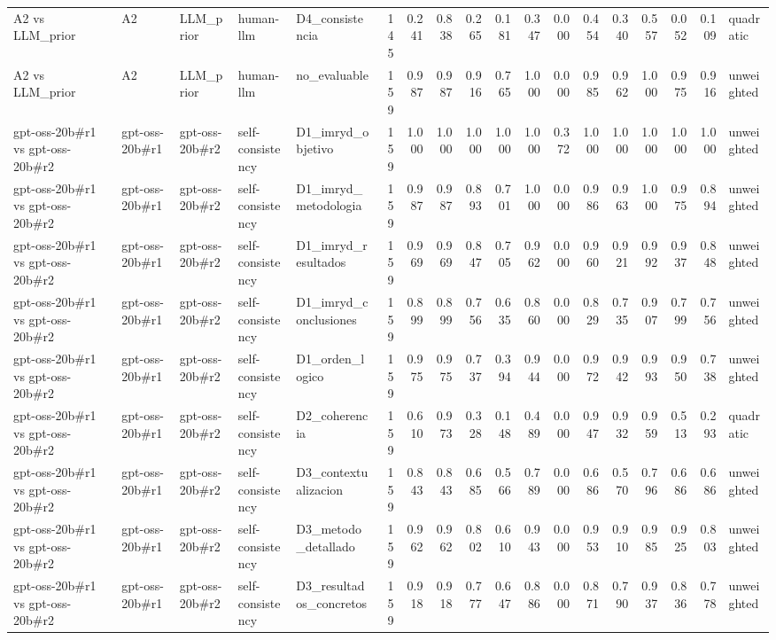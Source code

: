 \begin{table}
{\begin{tabular}{lllllrrrrrrrrrrrrl}
A2 vs LLM\_prior & A2 & LLM\_prior & human-llm & D4\_consistencia & 145 & 0.241 & 0.838 & 0.265 & 0.181 & 0.347 & 0.000 & 0.454 & 0.340 & 0.557 & 0.052 & 0.109 & quadratic \\
A2 vs LLM\_prior & A2 & LLM\_prior & human-llm & no\_evaluable & 159 & 0.987 & 0.987 & 0.916 & 0.765 & 1.000 & 0.000 & 0.985 & 0.962 & 1.000 & 0.975 & 0.916 & unweighted \\
gpt-oss-20b\#r1 vs gpt-oss-20b\#r2 & gpt-oss-20b\#r1 & gpt-oss-20b\#r2 & self-consistency & D1\_imryd\_objetivo & 159 & 1.000 & 1.000 & 1.000 & 1.000 & 1.000 & 0.372 & 1.000 & 1.000 & 1.000 & 1.000 & 1.000 & unweighted \\
gpt-oss-20b\#r1 vs gpt-oss-20b\#r2 & gpt-oss-20b\#r1 & gpt-oss-20b\#r2 & self-consistency & D1\_imryd\_metodologia & 159 & 0.987 & 0.987 & 0.893 & 0.701 & 1.000 & 0.000 & 0.986 & 0.963 & 1.000 & 0.975 & 0.894 & unweighted \\
gpt-oss-20b\#r1 vs gpt-oss-20b\#r2 & gpt-oss-20b\#r1 & gpt-oss-20b\#r2 & self-consistency & D1\_imryd\_resultados & 159 & 0.969 & 0.969 & 0.847 & 0.705 & 0.962 & 0.000 & 0.960 & 0.921 & 0.992 & 0.937 & 0.848 & unweighted \\
gpt-oss-20b\#r1 vs gpt-oss-20b\#r2 & gpt-oss-20b\#r1 & gpt-oss-20b\#r2 & self-consistency & D1\_imryd\_conclusiones & 159 & 0.899 & 0.899 & 0.756 & 0.635 & 0.860 & 0.000 & 0.829 & 0.735 & 0.907 & 0.799 & 0.756 & unweighted \\
gpt-oss-20b\#r1 vs gpt-oss-20b\#r2 & gpt-oss-20b\#r1 & gpt-oss-20b\#r2 & self-consistency & D1\_orden\_logico & 159 & 0.975 & 0.975 & 0.737 & 0.394 & 0.944 & 0.000 & 0.972 & 0.942 & 0.993 & 0.950 & 0.738 & unweighted \\
gpt-oss-20b\#r1 vs gpt-oss-20b\#r2 & gpt-oss-20b\#r1 & gpt-oss-20b\#r2 & self-consistency & D2\_coherencia & 159 & 0.610 & 0.973 & 0.328 & 0.148 & 0.489 & 0.000 & 0.947 & 0.932 & 0.959 & 0.513 & 0.293 & quadratic \\
gpt-oss-20b\#r1 vs gpt-oss-20b\#r2 & gpt-oss-20b\#r1 & gpt-oss-20b\#r2 & self-consistency & D3\_contextualizacion & 159 & 0.843 & 0.843 & 0.685 & 0.566 & 0.789 & 0.000 & 0.686 & 0.570 & 0.796 & 0.686 & 0.686 & unweighted \\
gpt-oss-20b\#r1 vs gpt-oss-20b\#r2 & gpt-oss-20b\#r1 & gpt-oss-20b\#r2 & self-consistency & D3\_metodo\_detallado & 159 & 0.962 & 0.962 & 0.802 & 0.610 & 0.943 & 0.000 & 0.953 & 0.910 & 0.985 & 0.925 & 0.803 & unweighted \\
gpt-oss-20b\#r1 vs gpt-oss-20b\#r2 & gpt-oss-20b\#r1 & gpt-oss-20b\#r2 & self-consistency & D3\_resultados\_concretos & 159 & 0.918 & 0.918 & 0.777 & 0.647 & 0.886 & 0.000 & 0.871 & 0.790 & 0.937 & 0.836 & 0.778 & unweighted \\

\end{tabular}}
\end{table}
